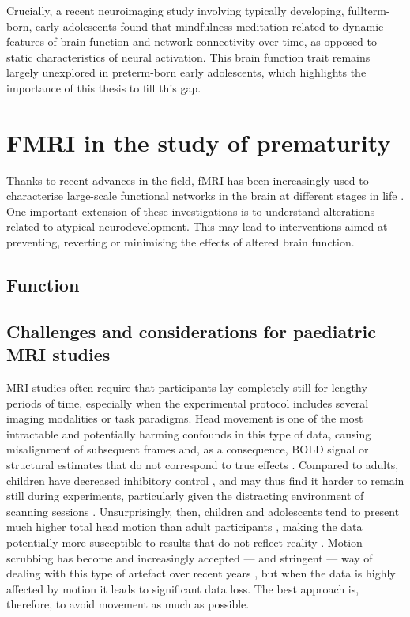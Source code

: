 Crucially, a recent neuroimaging study involving typically developing, fullterm-born, early adolescents found that mindfulness meditation related to dynamic features of brain function and network connectivity over time, as opposed to static characteristics of neural activation\citep{Marusak2018}. This brain function trait remains largely unexplored in preterm-born early adolescents, which highlights the importance of this thesis to fill this gap.




\section{FMRI in the study of prematurity}
\label{sub:fMRI_in_preterm}


Thanks to recent advances in the field, fMRI has been increasingly used to characterise large-scale functional networks in the brain at different stages in life \cite{Power2010}. 
One important extension of these investigations is to understand alterations related to atypical neurodevelopment. 
This may lead to interventions aimed at preventing, reverting or minimising the effects of altered brain function.


\subsection{Function} %
\subsection{Challenges and considerations for paediatric MRI studies}


MRI studies often require that participants lay completely still for lengthy periods of time, especially when the experimental protocol includes several imaging modalities or task paradigms. Head movement is one of the most intractable and potentially harming confounds in this type of data, causing misalignment of subsequent frames and, as a consequence, BOLD signal or structural estimates that do not correspond to true effects \citep{Friston1996, Siegel2017}. Compared to adults, children have decreased inhibitory control \citep{Bedard2002}, and may thus find it harder to remain still during experiments, particularly  given the distracting environment of scanning sessions \citep{Greene2016}. Unsurprisingly, then, children and adolescents tend to present much higher total head motion than adult participants \citep{Satterthwaite2013b}, making the data potentially more susceptible to results that do not reflect reality \citep{Power2012}. Motion scrubbing has become and increasingly accepted --- and stringent --- way of dealing with this type of artefact over recent years \citep{Power2014a,Laumann2016}, but when the data is highly affected by motion it leads to significant data loss. The best approach is, therefore, to avoid movement as much as possible.

